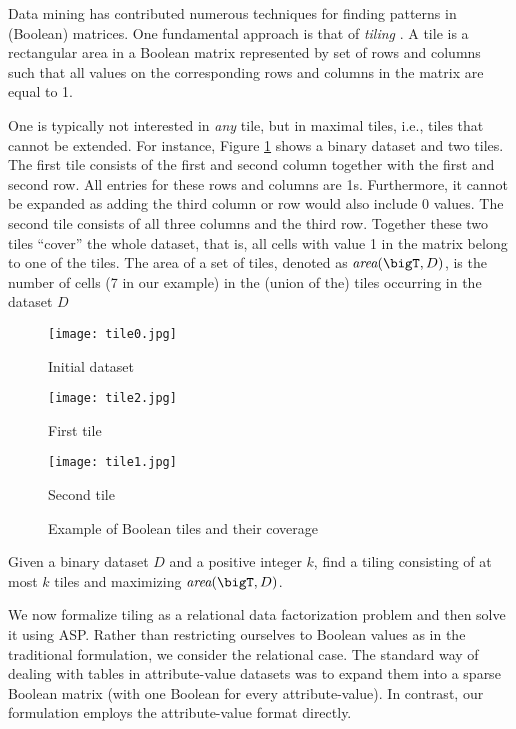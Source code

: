 Data mining has contributed numerous techniques for finding patterns in (Boolean) matrices. One fundamental approach is that of \emph{tiling} \citep{tiling}.  A tile is a rectangular area in a Boolean matrix represented by set of rows and columns such that all values on the corresponding rows and columns in the matrix are equal to 1.  

One is typically not interested in {\em any} tile, but in maximal tiles, i.e., tiles that cannot be extended.  For instance, Figure \ref{tilesExample} shows a binary dataset and two tiles. The first tile consists of the first and second column together with the first and second row. All entries for these rows and columns are 1s. 
Furthermore, it cannot be expanded as adding the third column or row would also include 0 values. The second tile
consists of all three columns and the third row. 
Together these two tiles ``cover'' the whole dataset, that is, all cells with value 1 in the matrix belong to one of the tiles. The area of a set of tiles, denoted as $\textit{area}(\bigT, D)$, is the number of cells (7 in our example) in the (union of the) tiles \bigT occurring in the dataset $D$ 
\begin{figure}[tbh]
  \centering
  \centering
  \texttt{[image: tile0.jpg]}
  \caption*{Initial dataset}
  \endminipage
  \centering
  \texttt{[image: tile2.jpg]}
  \caption*{First tile}
  \endminipage
  \centering
  \texttt{[image: tile1.jpg]}
  \caption*{Second tile}
  \endminipage
  \caption{Example of Boolean tiles and their coverage}
  \label{tilesExample}
\end{figure}



\begin{definition}
Given a binary dataset $D$ and a positive integer $k$, find a tiling \bigT consisting of at most $k$ tiles and maximizing $\textit{area}(\bigT, D)$.
\end{definition}

We now formalize tiling as a relational data factorization problem and then solve it using ASP. Rather than restricting ourselves to Boolean values as in the traditional formulation, we consider the relational case. The standard way of dealing with tables in attribute-value datasets was to expand them into a sparse Boolean matrix (with one Boolean for every attribute-value). In contrast, our formulation employs the attribute-value format directly. 

